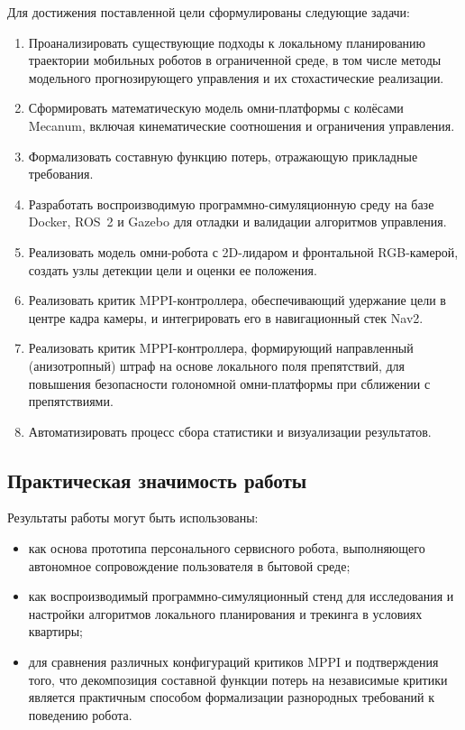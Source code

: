 Для достижения поставленной цели сформулированы следующие задачи:
\begin{enumerate}
    \item Проанализировать существующие подходы к локальному планированию
          траектории мобильных роботов в ограниченной среде, в том числе
          методы модельного прогнозирующего управления и их стохастические
          реализации.
    \item Сформировать математическую модель омни-платформы с колёсами
          Mecanum, включая кинематические соотношения и ограничения
          управления.
    \item Формализовать составную функцию потерь, отражающую прикладные
          требования.
    \item Разработать воспроизводимую программно-симуляционную среду на
          базе Docker, ROS~2 и Gazebo для отладки и валидации алгоритмов
          управления.
    \item Реализовать модель омни-робота с 2D-лидаром и фронтальной
          RGB-камерой, создать узлы детекции цели и оценки ее положения.
    \item Реализовать критик MPPI-контроллера,
          обеспечивающий удержание цели в центре кадра камеры, и
          интегрировать его в навигационный стек Nav2.
    \item Реализовать критик MPPI-контроллера, формирующий
          направленный (анизотропный) штраф на основе локального
          поля препятствий, для повышения безопасности голономной
          омни-платформы при сближении с препятствиями.
    \item Автоматизировать процесс сбора статистики и визуализации результатов.
\end{enumerate}

\subsection*{Практическая значимость работы}

Результаты работы могут быть использованы:
\begin{itemize}
    \item как основа прототипа персонального сервисного робота,
          выполняющего автономное сопровождение пользователя в бытовой
          среде;
    \item как воспроизводимый программно-симуляционный стенд для
          исследования и настройки алгоритмов локального планирования и
          трекинга в условиях квартиры;
    \item для сравнения различных конфигураций критиков MPPI и
          подтверждения того, что декомпозиция составной функции потерь
          на независимые критики является практичным способом формализации
          разнородных требований к поведению робота.
\end{itemize}